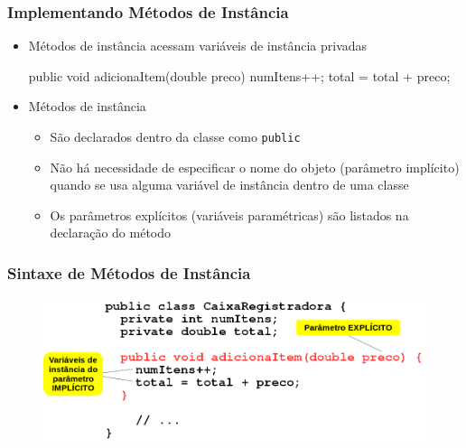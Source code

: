 \documentclass[xcolor={dvipsnames,table},aspectratio=169]{beamer}
\begin{document}
\begin{frame}[fragile]\frametitle{Implementando Métodos de Instância}
\begin{itemize}
	\item Métodos de instância acessam variáveis de instância privadas
\begin{javacode}
public void adicionaItem(double preco) {
  numItens++;
  total = total + preco;
}
\end{javacode}
	\item Métodos de instância
	\begin{itemize}
		\item São declarados dentro da classe como \texttt{public}
		\item Não há necessidade de especificar o nome do objeto (parâmetro implícito) quando se usa alguma variável de instância dentro de uma classe
		\item Os parâmetros explícitos (variáveis paramétricas) são listados na declaração do método
	\end{itemize}
\end{itemize}
\end{frame}

\begin{frame}\frametitle{Sintaxe de Métodos de Instância}
\begin{figure}[h]
	\includegraphics[height=0.60\paperheight,center]{pucrs-ep-fprog-unidade_07-objetos_e_classes-laminas-sintaxe_metodos_de_instancia.png}
\end{figure}
\end{frame}
\end{document}

